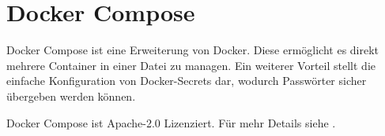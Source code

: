 \section{Docker Compose}\label{sec:docker-compose}

Docker Compose ist eine Erweiterung von Docker.
Diese ermöglicht es direkt mehrere Container in einer Datei zu managen.
Ein weiterer Vorteil stellt die einfache Konfiguration von Docker-Secrets dar, wodurch \ua Passwörter sicher übergeben werden können.

Docker Compose ist Apache-2.0 Lizenziert.
Für mehr Details siehe .

